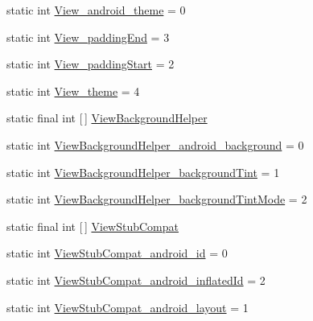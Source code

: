 \begin{DoxyCompactItemize}
\item 
static int \hyperlink{classandroid_1_1support_1_1v7_1_1appcompat_1_1R_1_1styleable_a399af2d06b82d2a76a27c8a307effed1}{View\+\_\+android\+\_\+theme} = 0
\item 
static int \hyperlink{classandroid_1_1support_1_1v7_1_1appcompat_1_1R_1_1styleable_a460b0b2b58042d9f069bb69a7abee61b}{View\+\_\+padding\+End} = 3
\item 
static int \hyperlink{classandroid_1_1support_1_1v7_1_1appcompat_1_1R_1_1styleable_a6a45d688c5e562564bd4ea8e8a8009da}{View\+\_\+padding\+Start} = 2
\item 
static int \hyperlink{classandroid_1_1support_1_1v7_1_1appcompat_1_1R_1_1styleable_a12b9f90d53fd9f125f955389e1951751}{View\+\_\+theme} = 4
\item 
static final int \mbox{[}$\,$\mbox{]} \hyperlink{classandroid_1_1support_1_1v7_1_1appcompat_1_1R_1_1styleable_a41b23c720259f27b563271bda1b5767a}{View\+Background\+Helper}
\item 
static int \hyperlink{classandroid_1_1support_1_1v7_1_1appcompat_1_1R_1_1styleable_a0c4b9c84285d81c51eed6464d0775ffc}{View\+Background\+Helper\+\_\+android\+\_\+background} = 0
\item 
static int \hyperlink{classandroid_1_1support_1_1v7_1_1appcompat_1_1R_1_1styleable_a3508f617e0fdda797627149c05c527f3}{View\+Background\+Helper\+\_\+background\+Tint} = 1
\item 
static int \hyperlink{classandroid_1_1support_1_1v7_1_1appcompat_1_1R_1_1styleable_ae71c6f8dbad2f486dc512dcaaada8083}{View\+Background\+Helper\+\_\+background\+Tint\+Mode} = 2
\item 
static final int \mbox{[}$\,$\mbox{]} \hyperlink{classandroid_1_1support_1_1v7_1_1appcompat_1_1R_1_1styleable_a59b69ba1b80ee4157819f6b964a66358}{View\+Stub\+Compat}
\item 
static int \hyperlink{classandroid_1_1support_1_1v7_1_1appcompat_1_1R_1_1styleable_ac15497ac2475a86ed2df12603e6c04a9}{View\+Stub\+Compat\+\_\+android\+\_\+id} = 0
\item 
static int \hyperlink{classandroid_1_1support_1_1v7_1_1appcompat_1_1R_1_1styleable_a5bf098f703699e17e91981a226ad0c4b}{View\+Stub\+Compat\+\_\+android\+\_\+inflated\+Id} = 2
\item 
static int \hyperlink{classandroid_1_1support_1_1v7_1_1appcompat_1_1R_1_1styleable_a6288011ef24789ef843fe6b8823fef96}{View\+Stub\+Compat\+\_\+android\+\_\+layout} = 1
\end{DoxyCompactItemize}


